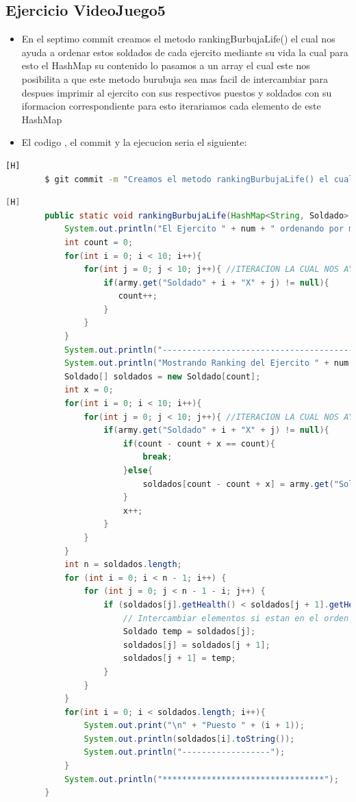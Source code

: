 \documentclass{article}
\begin{document}
	\subsection{Ejercicio VideoJuego5}
	\begin{itemize}	
		\item En el septimo commit creamos el metodo rankingBurbujaLife() el cual nos ayuda a ordenar estos soldados de cada ejercito mediante su vida la cual para esto el HashMap su contenido lo pasamos a un array el cual este nos posibilita a que este metodo burubuja sea mas facil de intercambiar para despues imprimir al ejercito con sus respectivos puestos y soldados con su iformacion correspondiente para esto iterariamos cada elemento de este HashMap
		\item El codigo , el commit y la ejecucion seria el siguiente:
	\end{itemize}	
	\begin{lstlisting}[language=bash,caption={Commit}][H]
		$ git commit -m "Creamos el metodo rankingBurbujaLife() el cual nos ayuda a ordenar estos soldados de cada ejercito mediante su vida la cual para esto el HashMap su contenido lo pasamos a un array el cual este nos posibilita a que este metodo burubuja sea mas facil de intercambiar para despues imprimir al ejercito con sus respectivos puestos y soldados con su iformacion correspondiente para esto iterariamos cada elemento de este HashMap"
	\end{lstlisting}	
	\begin{lstlisting}[language=java,caption={Las lineas de codigos del metodo creado:}][H]
		public static void rankingBurbujaLife(HashMap<String, Soldado> army , int num){
			System.out.println("El Ejercito " + num + " ordenando por metodo burbuja: ");
			int count = 0;
			for(int i = 0; i < 10; i++){
				for(int j = 0; j < 10; j++){ //ITERACION LA CUAL NOS AYUDA A PASAR POR TODOS LOS SOLDADOS DE CADA EJERCITO
					if(army.get("Soldado" + i + "X" + j) != null){ 
					   count++;
					}
				}
			}
			System.out.println("------------------------------------------");
			System.out.println("Mostrando Ranking del Ejercito " + num + " ..... ////// --->");
			Soldado[] soldados = new Soldado[count];
			int x = 0;
			for(int i = 0; i < 10; i++){
				for(int j = 0; j < 10; j++){ //ITERACION LA CUAL NOS AYUDA A PASAR POR TODOS LOS SOLDADOS AL ARRAY SOLDADO PARA PODER USAR EL USO DEL METODO DE ORDENACION BURBUJA
					if(army.get("Soldado" + i + "X" + j) != null){ 
						if(count - count + x == count){
							break;
						}else{
							soldados[count - count + x] = army.get("Soldado" + i + "X" + j);
						}
						x++;   
					}
				}
			}
			int n = soldados.length;
			for (int i = 0; i < n - 1; i++) {
				for (int j = 0; j < n - 1 - i; j++) {
					if (soldados[j].getHealth() < soldados[j + 1].getHealth()) {
						// Intercambiar elementos si estan en el orden incorrecto
						Soldado temp = soldados[j];
						soldados[j] = soldados[j + 1];
						soldados[j + 1] = temp;
					}
				}
			}
			for(int i = 0; i < soldados.length; i++){
				System.out.print("\n" + "Puesto " + (i + 1));
				System.out.println(soldados[i].toString());
				System.out.println("------------------");
			}
			System.out.println("*********************************");
		}
	\end{lstlisting}
\end{document}
